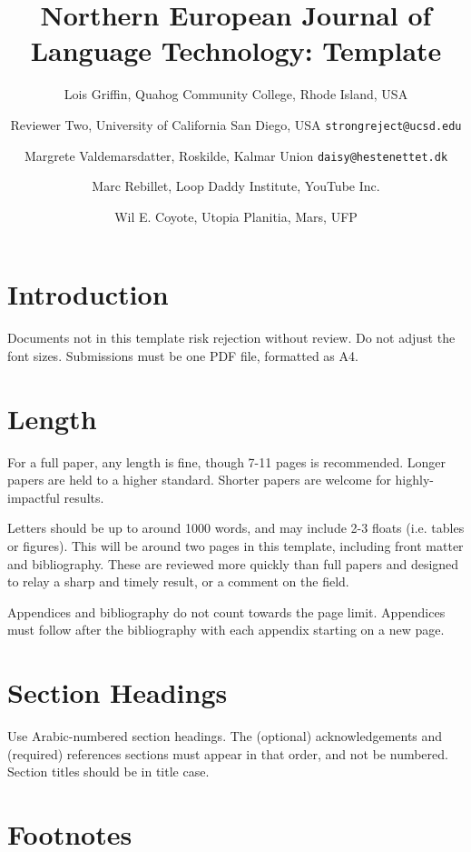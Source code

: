 \documentclass{article}
\title{Northern European Journal of Language Technology: Template}
\author{
Lois Griffin, {\normalsize Quahog Community College, Rhode Island, USA} \and
Reviewer Two, {\normalsize University of California San Diego, USA {\tt \small strongreject@ucsd.edu}} \and
Margrete Valdemarsdatter, {\normalsize Roskilde, Kalmar Union {\tt \small daisy@hestenettet.dk}} \and
Marc Rebillet, {\normalsize Loop Daddy Institute, YouTube Inc.} \and
Wil E. Coyote, {\normalsize Utopia Planitia, Mars, UFP} %
}
\begin{document}
\thispagestyle{title}


\maketitle

\section{Introduction}

Documents not in this template risk rejection without review. Do not adjust the font sizes. Submissions must be one PDF file, formatted as A4.

\section{Length}

For a full paper, any length is fine, though 7-11 pages is recommended. Longer papers are held to a higher standard. Shorter papers are welcome for highly-impactful results.

Letters should be up to around 1000 words, and may include 2-3 floats (i.e. tables or figures). This will be around two pages in this template, including front matter and bibliography. These are reviewed more quickly than full papers and designed to relay a sharp and timely result, or a comment on the field.

Appendices and bibliography do not count towards the page limit. Appendices must follow after the bibliography with each appendix starting on a new page.

\section{Section Headings}

Use Arabic-numbered section headings. The (optional) acknowledgements and (required) references sections must appear in that order, and not be numbered. Section titles should be in title case.

\section{Footnotes}
\end{document}
